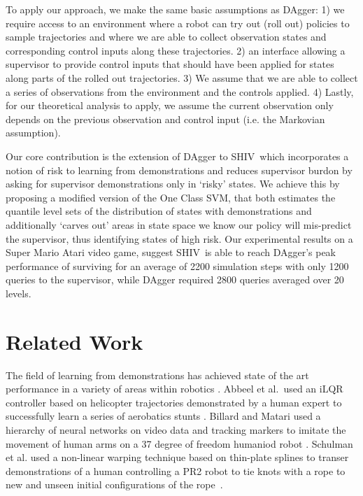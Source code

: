 \documentclass[10pt, conference]{ieeeconf}      %
\newcommand{\acro}{SHIV}
\begin{document}
To apply our approach, we make the same basic assumptions as DAgger: 1) we require access to an environment
where a robot can try out (roll out) policies to sample trajectories and where we are able to collect observation states
and corresponding control inputs along these trajectories. 2) an interface allowing a supervisor to provide control
inputs that should have been applied for states along parts of the rolled out trajectories. 3) We assume that we are
able to collect a series of observations from the environment and the controls applied. 4) Lastly, for our theoretical
analysis to apply, we assume the current observation only depends on the previous observation and control input (i.e.
the Markovian assumption).

Our core contribution is the extension of DAgger to \acro~which incorporates a notion of risk to learning from
demonstrations and reduces supervisor burdon by asking for supervisor demonstrations only in `risky' states. We achieve
this by proposing a modified version of the One Class SVM, that both estimates the quantile level sets of the
distribution of states with demonstrations and additionally `carves out' areas in state space we know our policy
will mis-predict the supervisor, thus identifying states of high risk.  Our experimental results on a Super Mario Atari
video game, suggest \acro~is able to reach DAgger's peak performance of surviving for an average of 2200 simulation
steps with only 1200 queries to the supervisor, while DAgger required 2800 queries averaged over 20 levels.

\section{Related Work}
The field of learning from demonstrations has achieved state of the art performance in a variety of areas within robotics
\cite{argall2009survey}. Abbeel et al.~used an iLQR controller based on helicopter trajectories demonstrated by a human expert
to successfully learn a series of aerobatics stunts \cite{abbeel2007application}. Billard and Matari used a hierarchy of
neural networks on video data and tracking markers to imitate the movement of human arms on a 37 degree of freedom humaniod
robot \cite{billard2001learning}. Schulman et al. used a non-linear warping technique based on thin-plate splines
to transer demonstrations of a human controlling a PR2 robot to tie knots with a rope to new and unseen initial
configurations of the rope~\cite{schulman2013case}. 
\end{document}

